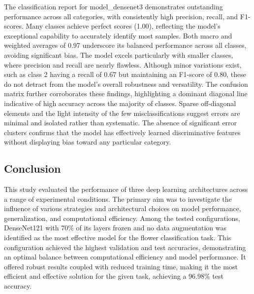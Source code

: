 The classification report for model\_densenet3 demonstrates outstanding performance across all categories, with
consistently high precision, recall, and F1-scores. Many classes achieve perfect scores (1.00), reflecting the model's
exceptional capability to accurately identify most samples. Both macro and weighted averages of 0.97 underscore its
balanced performance across all classes, avoiding significant bias. The model excels particularly with smaller classes,
where precision and recall are nearly flawless. Although minor variations exist, such as class 2 having a recall of 0.67
but maintaining an F1-score of 0.80, these do not detract from the model's overall robustness and versatility.
The confusion matrix further corroborates these findings, highlighting a dominant diagonal line indicative of high
accuracy across the majority of classes. Sparse off-diagonal elements and the light intensity of the few misclassifications
suggest errors are minimal and isolated rather than systematic. The absence of significant error clusters confirms that
the model has effectively learned discriminative features without displaying bias toward any particular category.


\subsection{Conclusion}

This study evaluated the performance of three deep learning architectures across a range of experimental conditions.
The primary aim was to investigate the influence of various strategies and architectural choices on model performance,
generalization, and computational efficiency. Among the tested configurations, DenseNet121 with 70\% of its layers
frozen and no data augmentation was identified as the most effective model for the flower classification task. This
configuration achieved the highest validation and test accuracies, demonstrating an optimal balance between computational
efficiency and model performance. It offered robust results coupled with reduced training time, making it the most
efficient and effective solution for the given task, achieving a 96.98\% test accuracy.


